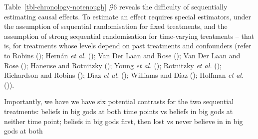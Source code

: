 \documentclass[
  single column]{article}
\begin{document}
Table~\ref{tbl-chronology-notenough} \(\mathcal{G} 6\) reveals the
difficulty of sequentially estimating causal effects. To estimate an
effect requires special estimators, under the assumption of sequential
randomisation for fixed treatments, and the assumption of strong
sequential randomisation for time-varying treatments -- that is, for
treatments whose levels depend on past treatments and confounders (refer
to Robins (); Hernán \emph{et al.}
(); Van Der Laan and Rose
(); Van Der Laan and Rose
(); Haneuse and Rotnitzky
(); Young \emph{et al.}
(); Rotnitzky \emph{et al.}
(); Richardson and Robins
(); Dı́az \emph{et al.}
(); Williams and Díaz
(); Hoffman \emph{et al.}
()).

Importantly, we have we have six potential contrasts for the two
sequential treatments: beliefs in big gods at both time points vs
beliefs in big gods at neither time point; beliefs in big gods first,
then lost vs never believe in in big gods at both
\end{document}

